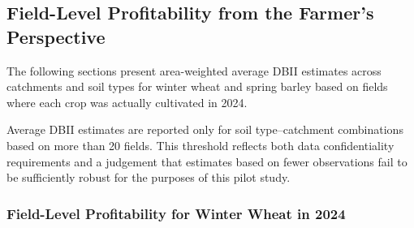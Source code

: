 \documentclass[12pt]{article}
\begin{document}



\subsection{Field-Level Profitability from the Farmer's Perspective} 
\label{sec:farmer-profitability}

The following sections present area-weighted average DBII estimates across catchments and soil types for winter wheat and spring barley based on fields where each crop was actually cultivated in 2024. 

Average DBII estimates are reported only for soil type--catchment combinations based on more than 20 fields. This threshold reflects both data confidentiality requirements and a judgement that estimates based on fewer observations fail to be sufficiently robust for the purposes of this pilot study. 


\subsubsection{Field-Level Profitability for Winter Wheat in 2024} 
\end{document}

